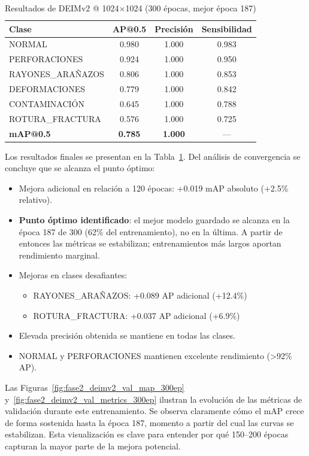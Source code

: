 \begin{table}[htbp]
\centering
\begin{tabular}{lccc}
\toprule
\textbf{Clase} & \textbf{AP@0.5} & \textbf{Precisión} & \textbf{Sensibilidad} \\
\midrule
NORMAL & 0.980 & 1.000 & 0.983 \\
PERFORACIONES & 0.924 & 1.000 & 0.950 \\
\mbox{RAYONES\_ARAÑAZOS} & 0.806 & 1.000 & 0.853 \\
DEFORMACIONES & 0.779 & 1.000 & 0.842 \\
CONTAMINACIÓN & 0.645 & 1.000 & 0.788 \\
\mbox{ROTURA\_FRACTURA} & 0.576 & 1.000 & 0.725 \\
\midrule
\textbf{mAP@0.5} & \textbf{0.785} & \textbf{1.000} & --- \\
\bottomrule
\end{tabular}
\caption{Resultados de DEIMv2 @ 1024×1024 (300 épocas, mejor época 187)}
\label{tab:deimv2_1024_300ep}
\end{table}

Los resultados finales se presentan en la Tabla~\ref{tab:deimv2_1024_300ep}. Del análisis de convergencia se concluye que se alcanza el punto óptimo:
\begin{itemize}
    \item Mejora adicional en relación a 120 épocas: +0.019 mAP absoluto (+2.5\% relativo).
    \item \textbf{Punto óptimo identificado}: el mejor modelo guardado se alcanza en la época 187 de 300 (62\% del entrenamiento), no en la última. A partir de entonces las métricas se estabilizan; entrenamientos más largos aportan rendimiento marginal.
    \item Mejoras en clases desafiantes:
    \begin{itemize}
        \item \mbox{RAYONES\_ARAÑAZOS}: +0.089 AP adicional (+12.4\%)
        \item \mbox{ROTURA\_FRACTURA}: +0.037 AP adicional (+6.9\%)
    \end{itemize}
    \item Elevada precisión obtenida se mantiene en todas las clases.
    \item NORMAL y PERFORACIONES mantienen excelente rendimiento (>92\% AP).
\end{itemize}

Las Figuras~\ref{fig:fase2_deimv2_val_map_300ep} y~\ref{fig:fase2_deimv2_val_metrics_300ep} ilustran la evolución de las métricas de validación durante este entrenamiento. Se observa claramente cómo el mAP crece de forma sostenida hasta la época 187, momento a partir del cual las curvas se estabilizan. Esta visualización es clave para entender por qué 150--200 épocas capturan la mayor parte de la mejora potencial.

